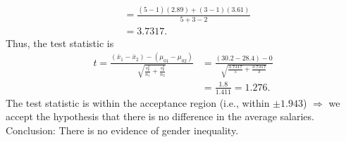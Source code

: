 \documentclass[12pt]{article}
\begin{document}
{\begin{minipage}[t]{0.98\textwidth}
\begin{minipage}[t]{0.47\textwidth}
\begin{enumerate}
\begin{align*}
&= \frac{(5 - 1) (2.89) + (3 - 1) (3.61)}{5+3-2}\\
&= 3.7317.
\end{align*}
Thus, the test statistic is
\begin{align*}
t= \frac{(\bar x_1 - \bar x_2) - (\mu_{01} - \mu_{02})}{\sqrt{\frac{s_p^2}{n_1}+\frac{s_p^2}{n_2}}} &= \frac{(30.2-28.4) - 0}{\sqrt{\frac{3.7317}{5}+\frac{3.7317}{3}}}\\[0.2cm]
&= \frac{1.8}{1.411} = 1.276.
\end{align*}
The test statistic is within the acceptance region (i.e., within $\pm1.943$) $\Rightarrow$ we accept the hypothesis that there is no difference in the average salaries.\\[0.3cm]
Conclusion: There is no evidence of gender inequality.
\end{enumerate}
\end{minipage}
\end{minipage}}\vspace{0.03\textwidth}
\end{document}
